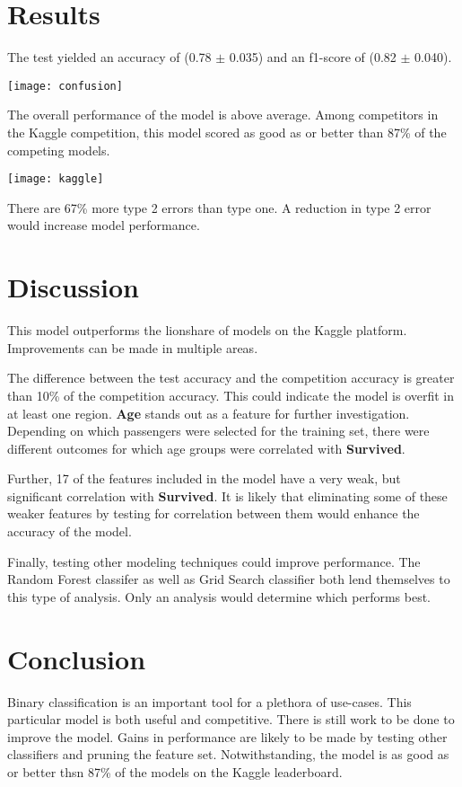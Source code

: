 \documentclass[10pt]{article}
\begin{document}
\begin{multicols}{2}
\section{Results}

	The test yielded an accuracy of (0.78 $\pm$ 0.035) and an f1-score of (0.82 $\pm$ 0.040).
	\begin{center}
		\texttt{[image: confusion]}
	\end{center}
	The overall performance of the model is above average.
	Among competitors in the Kaggle competition, this model scored as good as or better than 87\% of the competing models.
	\begin{center}
		\texttt{[image: kaggle]}
	\end{center}
	There are 67\% more type 2 errors than type one.
	A reduction in type 2 error would increase model performance.

\section{Discussion}

	This model outperforms the lionshare of models on the Kaggle platform.
	Improvements can be made in multiple areas.
	
	The difference  between the test accuracy and the competition accuracy is greater than 10\% of the competition accuracy.
	This could indicate the model is overfit in at least one region.
	\textbf{Age} stands out as a feature for further investigation.
	Depending on which passengers were selected for the training set, there were different outcomes for which age groups were correlated with \textbf{Survived}.

	Further, 17 of the features included in the model have a very weak, but significant correlation with \textbf{Survived}.
	It is likely that eliminating some of these weaker features by testing for correlation between them would enhance the accuracy of the model.
	
	Finally, testing other modeling techniques could improve performance.
	The Random Forest classifer as well as Grid Search classifier both lend themselves to this type of analysis.
	Only an analysis would determine which performs best.

\section{Conclusion}\label{conclusions}
	
	Binary classification is an important tool for a plethora of use-cases.
	This particular model is both useful and competitive.
	There is still work to be done to improve the model.
	Gains in performance are likely to be made by testing other classifiers and pruning the feature set.
	Notwithstanding, the model is as good as or better thsn 87\% of the models on the Kaggle leaderboard.


\end{multicols}
\end{document}
